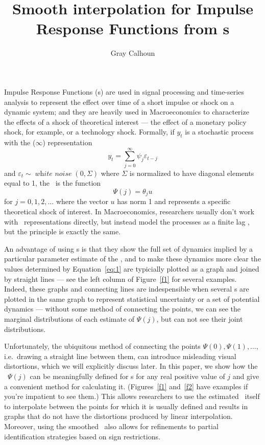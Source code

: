 \documentclass[12pt,fleqn]{article}
\title{Smooth interpolation for Impulse Response Functions from \allcaps{svar}s}
\author{Gray Calhoun}
\DeclareMathOperator{\whitenoise}{\mathit{white\ noise}}
\newcommand{\vep}{\varepsilon}
\begin{document}
\maketitle

Impulse Response Functions (\IRF s) are used in signal processing and
time-series analysis to represent the effect over time of a short
impulse or shock on a dynamic system; and they are heavily used in
Macroeconomics to characterize the effects of a shock of theoretical
interest --- the effect of a monetary policy shock, for example, or a
technology shock. Formally, if $y_t$ is a stochastic process with the
\MA($\infty$) representation
\begin{equation*}
  y_t = \sum_{j=0}^{\infty} \psi_j \vep_{t-j}
\end{equation*}
and $\vep_t \sim \whitenoise(0,\Sigma)$ where $\Sigma$ is normalized
to have diagonal elements equal to 1, the \IRF\ is the function
\begin{equation}\label{eq:1}
  \Psi(j) = \theta_j u
\end{equation}
for $j = 0, 1, 2,\dots$ where the vector $u$ has norm 1 and represents
a specific theoretical shock of interest. In Macroeconomics,
researchers usually don't work with \MA\ representations directly, but
instead model the processes as a finite lag \VAR, but the principle is
exactly the same.

An advantage of using \IRF s is that they show the full set of
dynamics implied by a particular parameter estimate of the \VAR, and
to make these dynamics more clear the values determined by
Equation~\eqref{eq:1} are typicially plotted as a graph and joined by
straight lines --- see the left column of Figure~\ref{f1} for several
examples. Indeed, these graphs and connecting lines are indespensible
when several \IRF s are plotted in the same graph to represent
statistical uncertainty or a set of potential dynamics --- without
some method of connecting the points, we can see the marginal
distributions of each estimate of $\Psi(j)$, but can not see their
joint distributions.

Unfortunately, the ubiquitous method of connecting the points
$\Psi(0), \Psi(1),\dots$, i.e.\ drawing a straight line between them,
can introduce misleading visual distortions, which we will explicitly
discuss later. In this paper, we show how the \IRF\ $\Psi(j)$ can be
meaningfully defined for \VAR s for any real positive value of $j$ and
give a convenient method for calculating it. (Figures~\ref{f1}
and~\ref{f2} have examples if you're impatient to see them.) This
allows researchers to use the estimated \VAR\ itself to interpolate
between the points for which it is usually defined and results in
graphs that do not have the distortions produced by linear
interpolation. Moreover, using the smoothed \IRF\ also allows for
refinements to partial identification strategies based on sign
restrictions.
\end{document}
